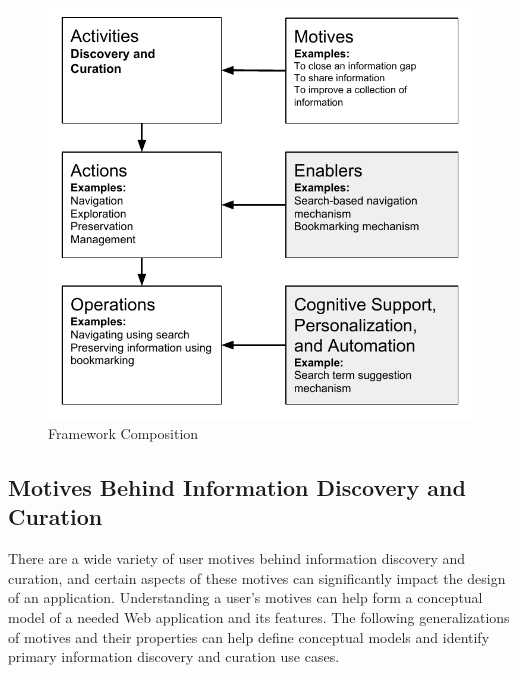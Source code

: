 \documentclass{sigchi}
\begin{document}
{\begin{figure}[ht!]
	\noindent
	\centering
    \includegraphics[width=\columnwidth]{figures/framework_overview.pdf}
	\caption{Framework Composition}
	\label{fig:framework_overview} 
\end{figure}


{\subsection{Motives Behind Information Discovery and Curation}


There are a wide variety of user motives behind information discovery and curation, and certain aspects of these motives can significantly impact the design of an application. Understanding a user's motives can help form a conceptual model of a needed Web application and its features. The following generalizations of motives and their properties can help define conceptual models and identify primary information discovery and curation use cases.  

}}
\end{document}
